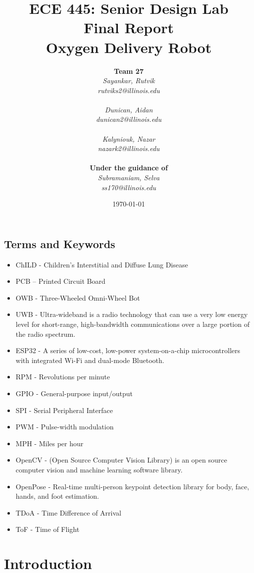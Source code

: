 \documentclass{report}
\title{ECE 445: Senior Design Lab \\ Final Report \\ Oxygen Delivery Robot} %
\author {
    \textbf{Team 27} \\ 
    \textit{Sayankar, Rutvik}\\
    \textit{rutviks2@illinois.edu} \\
    \hfill \\ 
    \textit{Dunican, Aidan}\\
    \textit{dunican2@illinois.edu} \\
    \hfill \\ 
    \textit{Kalyniouk, Nazar}\\
    \textit{nazark2@illinois.edu} \\
    \hfill \\ 
    \textbf{Under the guidance of} \\ 
    \textit{Subramaniam, Selva} \\
    \textit{ss170@illinois.edu} 
}
\date{\today} %
\begin{document}
    \maketitle %
    
    \pagebreak
    \tableofcontents %
    \pagebreak

    \section{Terms and Keywords}
    \vspace{0.8cm}
    \begin{itemize}
        \item ChILD - Children's Interstitial and Diffuse Lung Disease
        \item PCB – Printed Circuit Board
        \item OWB - Three-Wheeled Omni-Wheel Bot
        \item UWB - Ultra-wideband is a radio technology that can use a very low energy level for short-range, high-bandwidth communications over a large portion of the radio spectrum.
        \item ESP32 - A series of low-cost, low-power system-on-a-chip microcontrollers with integrated Wi-Fi and dual-mode Bluetooth.
        \item RPM - Revolutions per minute
        \item GPIO - General-purpose input/output
        \item SPI - Serial Peripheral Interface
        \item PWM - Pulse-width modulation
        \item MPH - Miles per hour
        \item OpenCV - (Open Source Computer Vision Library) is an open source computer vision and machine learning software library.
        \item OpenPose - Real-time multi-person keypoint detection library for body, face, hands, and foot estimation.
        \item TDoA - Time Difference of Arrival 
        \item ToF - Time of Flight
    \end{itemize}

    \pagebreak

    \chapter{Introduction}
\end{document}
